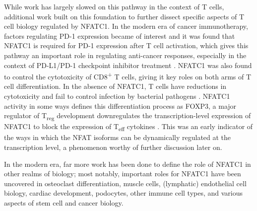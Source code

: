 While work has largely slowed on this pathway in the context of T cells, additional work built on this foundation to further dissect specific aspects of T cell biology regulated by NFATC1. In the modern era of cancer immunotherapy, factors regulating PD-1 expression became of interest and it was found that NFATC1 is required for PD-1 expression after T cell activation, which gives this pathway an important role in regulating anti-cancer responses, especially in the context of PD-L1/PD-1 checkpoint inhibitor treatment \citep{Oestreich2008}. NFATC1 was also found to control the cytotoxicity of CD8\textsuperscript{+} T cells, giving it key roles on both arms of T cell differentiation. In the absence of NFATC1, T cells have reductions in cytotoxicity and fail to control infection by bacterial pathogens \citep{KleinHessling2017}. NFATC1 activity in some ways defines this differentiation process as FOXP3, a major regulator of T\textsubscript{reg} development downregulates the transcription-level expression of NFATC1 to block the expression of T\textsubscript{eff} cytokines \citep{Torgerson2009}. This was an early indicator of the ways in which the NFAT isoforms can be dynamically regulated at the transcription level, a phenomenon worthy of further discussion later on.

In the modern era, far more work has been done to define the role of NFATC1 in other realms of biology; most notably, important roles for NFATC1 have been uncovered in osteoclast differentiation, muscle cells, (lymphatic) endothelial cell biology, cardiac development, podocytes, other immune cell types, and various aspects of stem cell and cancer biology.

